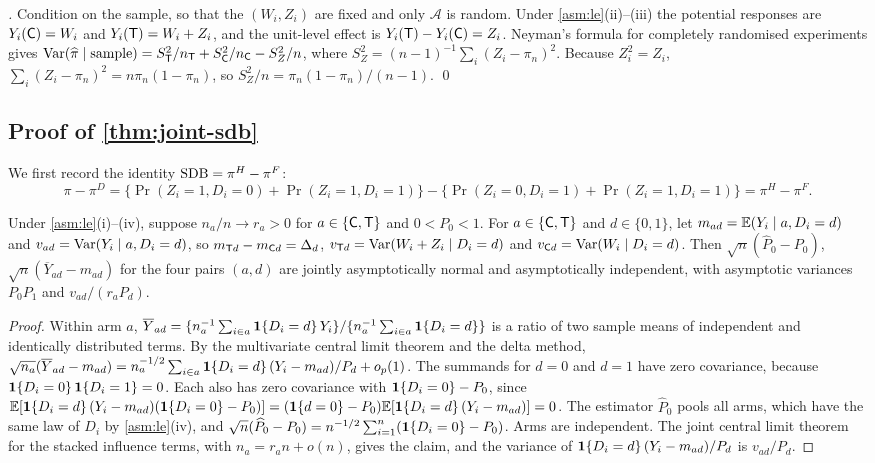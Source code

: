 \emph{.} Condition on the sample, so that the $(W_i,Z_i)$ are fixed and only $\mathcal A$ is random. Under \cref{asm:le}(ii)--(iii) the potential responses are $Y_i(\mathsf{C})=W_i$ and $Y_i(\mathsf{T})=W_i+Z_i$, and the unit-level effect is $Y_i(\mathsf{T})-Y_i(\mathsf{C})=Z_i$. Neyman's formula for completely randomised experiments \citep[ch.~6]{imbens2015} gives $\operatorname{Var}(\widehat\pi\mid\text{sample})=S_{\mathsf{T}}^2/n_{\mathsf{T}}+S_{\mathsf{C}}^2/n_{\mathsf{C}}-S_Z^2/n$, where $S_Z^2=(n-1)^{-1}\sum_i(Z_i-\pi_n)^2$. Because $Z_i^2=Z_i$, $\sum_i(Z_i-\pi_n)^2=n\pi_n(1-\pi_n)$, so $S_Z^2/n=\pi_n(1-\pi_n)/(n-1)$. \qed

\subsection{Proof of \texorpdfstring{\cref{thm:joint-sdb}}{the joint SDB theorem}}\label{app:pd-joint}

We first record the identity $\mathrm{SDB}=\pi^H-\pi^F$:
\[
  \pi-\pi^D=\{\Pr(Z_i=1,D_i=0)+\Pr(Z_i=1,D_i=1)\}-\{\Pr(Z_i=0,D_i=1)+\Pr(Z_i=1,D_i=1)\}=\pi^H-\pi^F.
\]

\begin{lemma}\label{lem:pd-strat}
Under \cref{asm:le}(i)--(iv), suppose $n_a/n\to r_a>0$ for $a\in\{\mathsf{C},\mathsf{T}\}$ and $0<P_0<1$. For $a\in\{\mathsf{C},\mathsf{T}\}$ and $d\in\{0,1\}$, let $m_{ad}=\mathbb{E}(Y_i\mid a,D_i=d)$ and $v_{ad}=\operatorname{Var}(Y_i\mid a,D_i=d)$, so $m_{\mathsf{T} d}-m_{\mathsf{C} d}=\Delta_d$, $v_{\mathsf{T} d}=\operatorname{Var}(W_i+Z_i\mid D_i=d)$ and $v_{\mathsf{C} d}=\operatorname{Var}(W_i\mid D_i=d)$. Then $\sqrt n(\widehat P_0-P_0)$, $\sqrt n(\overline Y_{ad}-m_{ad})$ for the four pairs $(a,d)$ are jointly asymptotically normal and asymptotically independent, with asymptotic variances $P_0P_1$ and $v_{ad}/(r_aP_d)$.
\end{lemma}

\begin{proof}
Within arm $a$, $\overline Y_{ad}=\{n_a^{-1}\sum_{i\in a}\mathbf{1}\!\left\{D_i=d\right\}Y_i\}/\{n_a^{-1}\sum_{i\in a}\mathbf{1}\!\left\{D_i=d\right\}\}$ is a ratio of two sample means of independent and identically distributed terms. By the multivariate central limit theorem and the delta method, $\sqrt{n_a}(\overline Y_{ad}-m_{ad})=n_a^{-1/2}\sum_{i\in a}\mathbf{1}\!\left\{D_i=d\right\}(Y_i-m_{ad})/P_d+o_p(1)$. The summands for $d=0$ and $d=1$ have zero covariance, because $\mathbf{1}\!\left\{D_i=0\right\}\mathbf{1}\!\left\{D_i=1\right\}=0$. Each also has zero covariance with $\mathbf{1}\!\left\{D_i=0\right\}-P_0$, since $\mathbb{E}[\mathbf{1}\!\left\{D_i=d\right\}(Y_i-m_{ad})(\mathbf{1}\!\left\{D_i=0\right\}-P_0)]=(\mathbf{1}\!\left\{d=0\right\}-P_0)\mathbb{E}[\mathbf{1}\!\left\{D_i=d\right\}(Y_i-m_{ad})]=0$. The estimator $\widehat P_0$ pools all arms, which have the same law of $D_i$ by \cref{asm:le}(iv), and $\sqrt n(\widehat P_0-P_0)=n^{-1/2}\sum_{i=1}^n(\mathbf{1}\!\left\{D_i=0\right\}-P_0)$. Arms are independent. The joint central limit theorem for the stacked influence terms, with $n_a=r_an+o(n)$, gives the claim, and the variance of $\mathbf{1}\!\left\{D_i=d\right\}(Y_i-m_{ad})/P_d$ is $v_{ad}/P_d$.
\end{proof}

